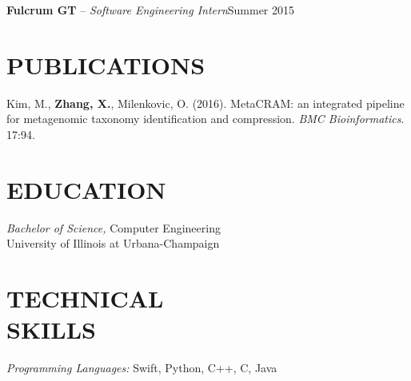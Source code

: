 \documentclass[resmargin]{res}
\begin{document}
\begin{resume}
	\vspace{-3mm}
	{\bf Fulcrum GT} -- {\sl Software Engineering Intern}\hfill Summer 2015

\section{PUBLICATIONS}
	\textnormal{Kim, M., \textbf{Zhang, X.}, Milenkovic, O. (2016). MetaCRAM: an integrated pipeline for metagenomic taxonomy identification and compression. \textit{BMC Bioinformatics}. 17:94.}

\section{EDUCATION} {\sl Bachelor of Science,} Computer Engineering \\
                University of Illinois at Urbana-Champaign

\section{TECHNICAL \\ SKILLS} 
{\sl Programming Languages:} Swift, Python, C++, C, Java\\

\end{resume}
\end{document}
